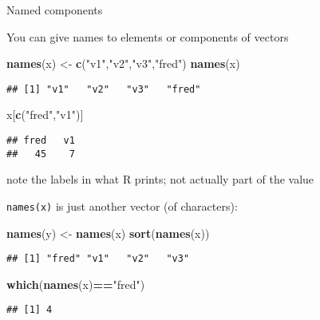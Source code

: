 \documentclass[8pt,ignorenonframetext,]{beamer}
\newenvironment{Shaded}{\begin{snugshade}}{\end{snugshade}}
\newcommand{\KeywordTok}[1]{\textcolor[rgb]{0.13,0.29,0.53}{\textbf{#1}}}
\newcommand{\StringTok}[1]{\textcolor[rgb]{0.31,0.60,0.02}{#1}}
\newcommand{\OperatorTok}[1]{\textcolor[rgb]{0.81,0.36,0.00}{\textbf{#1}}}
\newcommand{\NormalTok}[1]{#1}
\begin{document}
\begin{frame}[fragile]{Named components}

You can give names to elements or components of vectors

\begin{Shaded}
\begin{Highlighting}[]
\KeywordTok{names}\NormalTok{(x) <-}\StringTok{ }\KeywordTok{c}\NormalTok{(}\StringTok{"v1"}\NormalTok{,}\StringTok{"v2"}\NormalTok{,}\StringTok{"v3"}\NormalTok{,}\StringTok{"fred"}\NormalTok{)}
\KeywordTok{names}\NormalTok{(x)}
\end{Highlighting}
\end{Shaded}

\begin{verbatim}
## [1] "v1"   "v2"   "v3"   "fred"
\end{verbatim}

\begin{Shaded}
\begin{Highlighting}[]
\NormalTok{x[}\KeywordTok{c}\NormalTok{(}\StringTok{"fred"}\NormalTok{,}\StringTok{"v1"}\NormalTok{)]}
\end{Highlighting}
\end{Shaded}

\begin{verbatim}
## fred   v1 
##   45    7
\end{verbatim}

note the labels in what R prints; not actually part of the value

\end{frame}

\begin{frame}[fragile]{}

\texttt{names(x)} is just another vector (of characters):

\begin{Shaded}
\begin{Highlighting}[]
\KeywordTok{names}\NormalTok{(y) <-}\StringTok{ }\KeywordTok{names}\NormalTok{(x)}
\KeywordTok{sort}\NormalTok{(}\KeywordTok{names}\NormalTok{(x))}
\end{Highlighting}
\end{Shaded}

\begin{verbatim}
## [1] "fred" "v1"   "v2"   "v3"
\end{verbatim}

\begin{Shaded}
\begin{Highlighting}[]
\KeywordTok{which}\NormalTok{(}\KeywordTok{names}\NormalTok{(x)}\OperatorTok{==}\StringTok{"fred"}\NormalTok{)}
\end{Highlighting}
\end{Shaded}

\begin{verbatim}
## [1] 4
\end{verbatim}

\end{frame}
\end{document}
